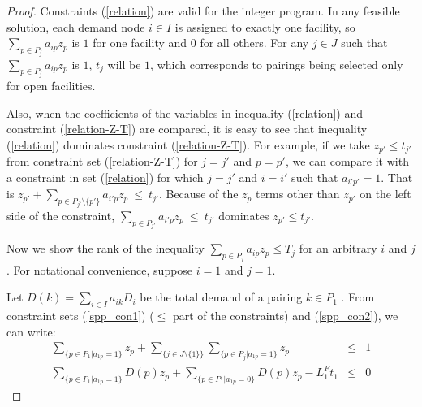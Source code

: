 \begin{proof} 
Constraints (\ref{relation}) are valid for the integer program. In any feasible solution,
each demand node $i \in I$ is assigned to exactly one facility, so 
$\sum_{p \in P_j} a_{ip} z_{p}$ is $1$ for one facility and $0$ for all others. 
For any $j \in J$ such that $\sum_{p \in P_j} a_{ip} z_{p}$ is $1$, $t_j$ will be $1$, 
which corresponds to pairings being selected only for open facilities. 


Also, when the coefficients of the variables in inequality (\ref{relation}) and constraint 
(\ref{relation-Z-T}) are compared, it is easy to see that inequality (\ref{relation}) 
dominates constraint (\ref{relation-Z-T}). For example, if we take $z_{p'} \leq t_{j'}$
from constraint set (\ref{relation-Z-T}) for $j=j'$ and $p=p'$, we can compare it with a
constraint in set (\ref{relation}) for which $j=j'$ and $i=i'$ such that $a_{i'p'}=1$. 
That is $z_{p'}+\sum_{p \in P_{j'}\setminus\{p'\}}a_{i'p}z_{p}\ \leq \ t_{j'}$. Because 
of the $z_{p}$ terms other than  $z_{p'}$ on the left side of the constraint,   
$\sum_{p \in P_{j'}}a_{i'p}z_{p}\ \leq \ t_{j'}$ dominates $z_{p'} \leq t_{j'}$. 

Now we show the rank of the inequality $\sum_{p \in P_j} a_{ip} z_{p} \leq T_j$ 
for an arbitrary $i$ and $j$. For notational convenience, suppose $i=1$ and $j=1$.  

Let $D(k)=\sum_{i \in I}a_{ik}D_i$ be the total demand of a pairing $ k\in P_1$ . 
From constraint sets (\ref{spp_con1}) ($\leq$ part of the constraints) and (\ref{spp_con2}), 
we can write:
\begin{eqnarray}
 \sum_{\{p \in P_1 | a_{1p}=1\}} z_{p} + \sum_{\{j \in J \setminus \{1\}\}}\sum_{\{p \in P_{j}|a_{1p}=1\}}z_{p}  &\leq & 1 \label{prop2-a} \\
 \sum_{\{p \in P_1 | a_{1p}=1\}} D(p) z_{p} + \sum_{\{p \in P_1 | a_{1p}=0\}} D(p) z_{p} - L^F_1 t_1 & \leq & 0 \label{prop2-b} 
\end{eqnarray} 


\end{proof}
